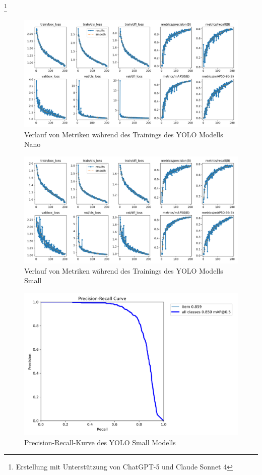 \label{anhang:evaluation_rtdetr_code}
\footnote{Erstellung mit Unterstützung von ChatGPT-5 und Claude Sonnet 4}



\label{anhang:training_verlauf}
\label{anhang:training_nano}
\begin{figure}[htb]
\centering
\includegraphics[width=0.9\linewidth]{graphics/yolo_eval/model_n/results.png}
\caption{Verlauf von Metriken während des Trainings des \ac{YOLO} Modells Nano}
\end{figure}

\label{anhang:training_small}
\begin{figure}[htb]
\centering
\includegraphics[width=0.9\linewidth]{graphics/yolo_eval/model_s/results.png}
\caption{Verlauf von Metriken während des Trainings des \ac{YOLO} Modells Small}
\end{figure}

\label{anhang:pr_curve_small}
\begin{figure}[htb]
\centering
\includegraphics[width=0.9\linewidth]{graphics/yolo_eval/model_s/BoxPR_curve.png}
\caption{Precision-Recall-Kurve des \ac{YOLO} Small Modells}
\end{figure}